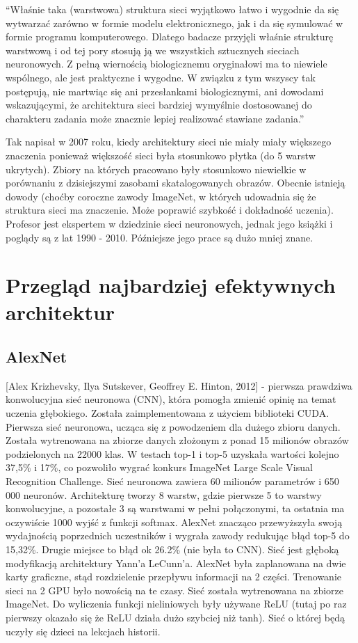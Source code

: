 \documentclass[12pt,a4paper,twoside,titlepage,openright]{book}
\begin{document}
{“Właśnie taka (warstwowa) struktura sieci wyjątkowo łatwo i wygodnie da się wytwarzać zarówno w formie modelu elektronicznego, jak i da się symulować w formie programu komputerowego. Dlatego badacze przyjęli właśnie strukturę warstwową i od tej pory stosują ją we wszystkich sztucznych sieciach neuronowych. Z pełną wiernością biologicznemu oryginałowi ma to niewiele wspólnego, ale jest praktyczne i wygodne. W związku z tym wszyscy tak postępują, nie martwiąc się ani przesłankami biologicznymi, ani dowodami wskazującymi, że architektura sieci bardziej wymyślnie dostosowanej do charakteru zadania może znacznie lepiej realizować stawiane zadania.”

Tak napisał w 2007 roku, kiedy architektury sieci nie miały miały większego znaczenia ponieważ większość sieci była stosunkowo płytka (do 5 warstw ukrytych). Zbiory na których pracowano były stosunkowo niewielkie w porównaniu z dzisiejszymi zasobami skatalogowanych obrazów. 
Obecnie istnieją dowody (choćby coroczne zawody ImageNet, w których udowadnia się że struktura sieci ma znaczenie. Może poprawić szybkość i dokładność uczenia). Profesor jest ekspertem w dziedzinie sieci neuronowych, jednak jego książki i poglądy są z lat 1990 - 2010. Późniejsze jego prace są dużo mniej znane.

\section{Przegląd najbardziej efektywnych architektur}

\subsection{AlexNet}
 [Alex Krizhevsky, Ilya Sutskever, Geoffrey E. Hinton, 2012] - pierwsza prawdziwa konwolucyjna sieć neuronowa (CNN), która pomogła zmienić opinię na temat uczenia głębokiego. Została zaimplementowana z użyciem biblioteki CUDA. Pierwsza sieć neuronowa, ucząca się z powodzeniem dla dużego zbioru danych.
 Została wytrenowana na zbiorze danych złożonym z ponad 15 milionów obrazów podzielonych na 22000 klas. 
 W testach top-1 i top-5 uzyskała wartości kolejno 37,5\% i 17\%, co pozwoliło wygrać konkurs ImageNet Large Scale Visual Recognition Challenge. 
 Sieć neuronowa zawiera 60 milionów parametrów i 650 000 neuronów. Architekturę tworzy 8 warstw, gdzie pierwsze 5 to warstwy konwolucyjne, a pozostałe 3 są warstwami w pełni połączonymi, ta ostatnia ma oczywiście 1000 wyjść z funkcji softmax. AlexNet znacząco przewyższyła swoją wydajnością poprzednich uczestników i wygrała zawody redukując błąd top-5 do 15,32\%. Drugie miejsce to błąd ok 26.2\% (nie była to CNN). Sieć jest głęboką modyfikacją architektury Yann’a LeCunn’a. AlexNet była zaplanowana na dwie karty graficzne, stąd rozdzielenie przepływu informacji na 2 części. Trenowanie sieci na 2 GPU było nowością na te czasy. Sieć została wytrenowana na zbiorze ImageNet. Do wyliczenia funkcji nieliniowych były używane ReLU (tutaj po raz pierwszy okazało się że ReLU działa dużo szybciej niż tanh). Sieć o której będą uczyły się dzieci na lekcjach historii. \cite{NIPS2012_4824}

}
\end{document}
